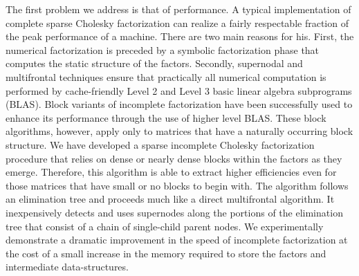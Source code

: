 \documentclass{report}
\begin{document}
The first problem we address is that of performance. A typical
implementation of complete sparse Cholesky factorization
can realize a fairly respectable fraction of the peak performance of a
machine. There are two main reasons for his. First, the numerical
factorization is preceded by a symbolic factorization phase that
computes the static structure of the factors.
Secondly, supernodal and multifrontal
techniques ensure that practically all numerical computation is performed by
cache-friendly Level 2 and Level 3 basic linear algebra subprograms
(BLAS). Block variants of incomplete
factorization have been successfully used to enhance its performance
through the use of higher level BLAS.
These block algorithms, however, apply only to matrices that
have a naturally occurring block structure. We have developed a sparse
incomplete Cholesky factorization procedure that relies on dense or nearly
dense blocks within the factors as they emerge. Therefore, this
algorithm is able to extract higher efficiencies even for those matrices
that have small or no blocks to begin with.
The algorithm follows an elimination
tree and proceeds much like a direct multifrontal
algorithm. It inexpensively detects and uses supernodes along the
portions of the elimination tree that consist of a chain of single-child
parent nodes. We experimentally demonstrate a dramatic improvement in
the speed of incomplete factorization at the cost of a small increase
in the memory required to store the factors and intermediate data-structures.
\end{document}
